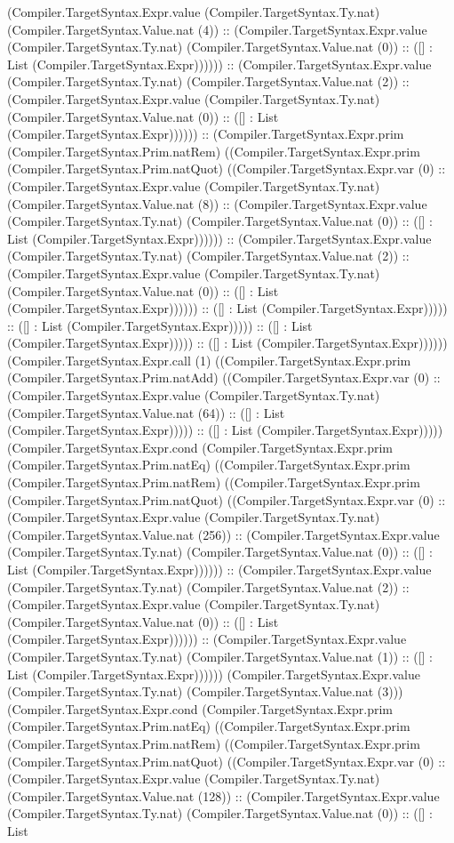 \documentclass[11pt]{article}
\begin{document}
(Compiler.TargetSyntax.Expr.value (Compiler.TargetSyntax.Ty.nat) (Compiler.TargetSyntax.Value.nat (4)) :: (Compiler.TargetSyntax.Expr.value (Compiler.TargetSyntax.Ty.nat) (Compiler.TargetSyntax.Value.nat (0)) :: ([] : List (Compiler.TargetSyntax.Expr)))))) :: (Compiler.TargetSyntax.Expr.value (Compiler.TargetSyntax.Ty.nat) (Compiler.TargetSyntax.Value.nat (2)) :: (Compiler.TargetSyntax.Expr.value (Compiler.TargetSyntax.Ty.nat) (Compiler.TargetSyntax.Value.nat (0)) :: ([] : List (Compiler.TargetSyntax.Expr)))))) :: (Compiler.TargetSyntax.Expr.prim (Compiler.TargetSyntax.Prim.natRem) ((Compiler.TargetSyntax.Expr.prim (Compiler.TargetSyntax.Prim.natQuot) ((Compiler.TargetSyntax.Expr.var (0) :: (Compiler.TargetSyntax.Expr.value (Compiler.TargetSyntax.Ty.nat) (Compiler.TargetSyntax.Value.nat (8)) :: (Compiler.TargetSyntax.Expr.value (Compiler.TargetSyntax.Ty.nat) (Compiler.TargetSyntax.Value.nat (0)) :: ([] : List (Compiler.TargetSyntax.Expr)))))) :: (Compiler.TargetSyntax.Expr.value (Compiler.TargetSyntax.Ty.nat) (Compiler.TargetSyntax.Value.nat (2)) :: (Compiler.TargetSyntax.Expr.value (Compiler.TargetSyntax.Ty.nat) (Compiler.TargetSyntax.Value.nat (0)) :: ([] : List (Compiler.TargetSyntax.Expr)))))) :: ([] : List (Compiler.TargetSyntax.Expr))))) :: ([] : List (Compiler.TargetSyntax.Expr))))) :: ([] : List (Compiler.TargetSyntax.Expr))))) :: ([] : List (Compiler.TargetSyntax.Expr)))))) (Compiler.TargetSyntax.Expr.call (1) ((Compiler.TargetSyntax.Expr.prim (Compiler.TargetSyntax.Prim.natAdd) ((Compiler.TargetSyntax.Expr.var (0) :: (Compiler.TargetSyntax.Expr.value (Compiler.TargetSyntax.Ty.nat) (Compiler.TargetSyntax.Value.nat (64)) :: ([] : List (Compiler.TargetSyntax.Expr))))) :: ([] : List (Compiler.TargetSyntax.Expr))))) (Compiler.TargetSyntax.Expr.cond (Compiler.TargetSyntax.Expr.prim (Compiler.TargetSyntax.Prim.natEq) ((Compiler.TargetSyntax.Expr.prim (Compiler.TargetSyntax.Prim.natRem) ((Compiler.TargetSyntax.Expr.prim (Compiler.TargetSyntax.Prim.natQuot) ((Compiler.TargetSyntax.Expr.var (0) :: (Compiler.TargetSyntax.Expr.value (Compiler.TargetSyntax.Ty.nat) (Compiler.TargetSyntax.Value.nat (256)) :: (Compiler.TargetSyntax.Expr.value (Compiler.TargetSyntax.Ty.nat) (Compiler.TargetSyntax.Value.nat (0)) :: ([] : List (Compiler.TargetSyntax.Expr)))))) :: (Compiler.TargetSyntax.Expr.value (Compiler.TargetSyntax.Ty.nat) (Compiler.TargetSyntax.Value.nat (2)) :: (Compiler.TargetSyntax.Expr.value (Compiler.TargetSyntax.Ty.nat) (Compiler.TargetSyntax.Value.nat (0)) :: ([] : List (Compiler.TargetSyntax.Expr)))))) :: (Compiler.TargetSyntax.Expr.value (Compiler.TargetSyntax.Ty.nat) (Compiler.TargetSyntax.Value.nat (1)) :: ([] : List (Compiler.TargetSyntax.Expr)))))) (Compiler.TargetSyntax.Expr.value (Compiler.TargetSyntax.Ty.nat) (Compiler.TargetSyntax.Value.nat (3))) (Compiler.TargetSyntax.Expr.cond (Compiler.TargetSyntax.Expr.prim (Compiler.TargetSyntax.Prim.natEq) ((Compiler.TargetSyntax.Expr.prim (Compiler.TargetSyntax.Prim.natRem) ((Compiler.TargetSyntax.Expr.prim (Compiler.TargetSyntax.Prim.natQuot) ((Compiler.TargetSyntax.Expr.var (0) :: (Compiler.TargetSyntax.Expr.value (Compiler.TargetSyntax.Ty.nat) (Compiler.TargetSyntax.Value.nat (128)) :: (Compiler.TargetSyntax.Expr.value (Compiler.TargetSyntax.Ty.nat) (Compiler.TargetSyntax.Value.nat (0)) :: ([] : List 
\end{document}
